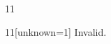 \documentclass[paper=A4]{ropas-poster}
\begin{document}
\begin{postergrid}{1}{1}
\begin{posterblock}{1}{1}[unknown=1]
Invalid.
\end{posterblock}
\end{postergrid}
\end{document}
